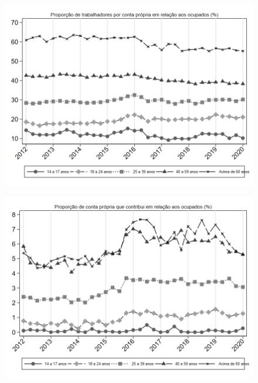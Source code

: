 \begin{frame}[label=_composicao_demografica_faixa_etaria_prop_cpropria]{}
\textit{\hyperlink{_composicao_demografica_faixa_etaria}{}}
\begin{figure}
  \centering
  \includegraphics[width=1.0\linewidth]{../../analysis/output/composicao_demografica/faixa_etaria/_composicao_demografica_faixa_etaria_prop_cpropria.png}
  \caption{}
  \label{fig:_composicao_demografica_faixa_etaria_prop_cpropria}
\end{figure}
\end{frame}

\begin{frame}[label=_composicao_demografica_faixa_etaria_prop_cpropriaC]{}
\textit{\hyperlink{_composicao_demografica_faixa_etaria}{}}
\begin{figure}
  \centering
  \includegraphics[width=1.0\linewidth]{../../analysis/output/composicao_demografica/faixa_etaria/_composicao_demografica_faixa_etaria_prop_cpropriaC.png}
  \caption{}
  \label{fig:_composicao_demografica_faixa_etaria_prop_cpropriaC}
\end{figure}
\end{frame}

